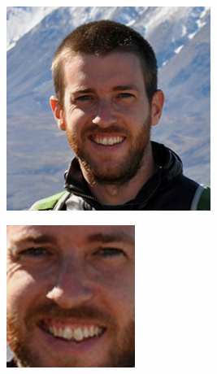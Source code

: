 \begin{figure}[H]
\begin{subfigure}{0.65\textwidth}
\begin{subfigure}{.33\textwidth}
  \caption{}
\end{subfigure}%
\end{subfigure}%
\begin{subfigure}{0.65\textwidth}
\begin{subfigure}{.33\textwidth}
  \centering
  \includegraphics[width=0.95\textwidth]{img/fdResult2/input92.png}
  \caption{}
\end{subfigure}%
\begin{subfigure}{.33\textwidth}
  \centering
  \includegraphics[width=0.6\textwidth]{img/fdResult2/output92.png}
  \caption{}
\end{subfigure}%
\end{subfigure}%


\end{figure}
